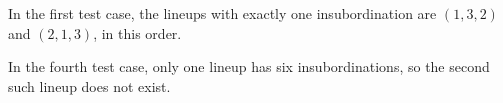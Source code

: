 In the first test case, the lineups with exactly one insubordination are $(1,3,2)$ and $(2,1,3)$, in this order.

In the fourth test case, only one lineup has six insubordinations, so the second such lineup does not exist.
